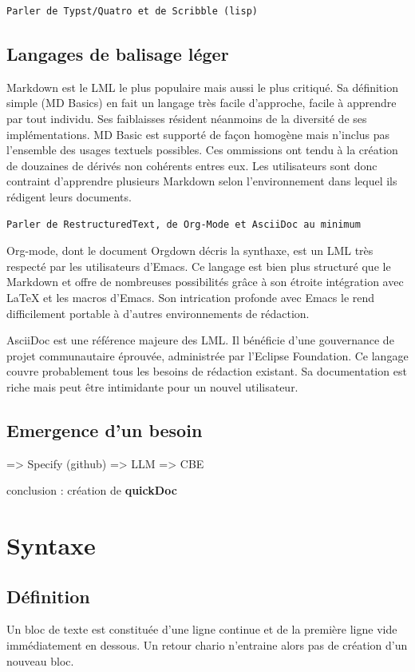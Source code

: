 \documentclass[a4paper,12pt]{article}
\begin{document}
\begin{verbatim}
Parler de Typst/Quatro et de Scribble (lisp)
\end{verbatim}
\subsection{Langages de balisage léger}
\label{sec:org7e4c35c}
Markdown est le LML le plus populaire mais aussi le plus critiqué. Sa définition simple (MD Basics) en fait un langage très facile d'approche, facile à apprendre par tout individu. Ses faiblaisses résident néanmoins de la diversité de ses implémentations. MD Basic est supporté de façon homogène mais n'inclus pas l'ensemble des usages textuels possibles. Ces ommissions ont tendu à la création de douzaines de dérivés non cohérents entres eux. Les utilisateurs sont donc contraint d'apprendre plusieurs Markdown selon l'environnement dans lequel ils rédigent leurs documents.

\begin{verbatim}
Parler de RestructuredText, de Org-Mode et AsciiDoc au minimum
\end{verbatim}

Org-mode, dont le document Orgdown décris la synthaxe, est un LML très respecté par les utilisateurs d'Emacs. Ce langage est bien plus structuré que le Markdown et offre de nombreuses possibilités grâce à son étroite intégration avec \LaTeX{} et les macros d'Emacs. Son intrication profonde avec Emacs le rend difficilement portable à d'autres environnements de rédaction.

AsciiDoc est une référence majeure des LML. Il bénéficie d'une gouvernance de projet communautaire éprouvée, administrée par l'Eclipse Foundation. Ce langage couvre probablement tous les besoins de rédaction existant. Sa documentation est riche mais peut être intimidante pour un nouvel utilisateur.
\subsection{Emergence d'un besoin}
\label{sec:orgb885cb3}
=> Specify (github)
=> LLM
=> CBE

conclusion : création de \textbf{quickDoc}
\section{Syntaxe}
\label{sec:org8734ad1}
\subsection{Définition}
\label{sec:org69c93bf}
Un bloc de texte est constituée d'une ligne continue et de la première ligne vide immédiatement en dessous. Un retour chario n'entraine alors pas de création d'un nouveau bloc.
\end{document}
